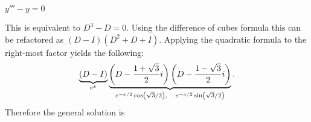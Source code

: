 $y'''-y=0$

\soln This is equivalent to $D^3 - D = 0$. Using the difference of cubes formula this can be refactored as $(D-I)(D^2+D+I)$. Applying the quadratic formula to the right-most factor yields the following:
$$
\underbrace{(D-I)}_{e^{x}}
\underbrace{\pars{D-\frac{1+\sqrt{3}}{2}i}\pars{D-\frac{1-\sqrt{3}}{2}i}}_{e^{-x/2} \cos (\sqrt{3}/2), \quad e^{-x/2} \sin (\sqrt{3}/2)}.$$
Therefore the general solution is 
